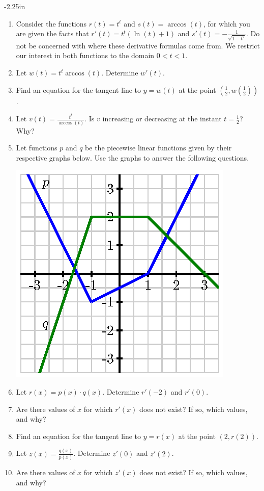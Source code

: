 \begin{adjustwidth*}{}{-2.25in}
\setlength{\columnsep}{25pt}
\begin{multicols*}{2}\small

\begin{enumerate}[1),start=40]
\item Consider the functions $r(t) = t^t$ and $s(t) = \arccos(t)$, for which you are given the facts that $r'(t) = t^t(\ln(t) + 1)$ and $s'(t) = -\frac{1}{\sqrt{1-t^2}}$.  Do not be concerned with where these derivative formulas come from.  We restrict our interest in both functions to the domain $0 < t < 1$.
\ba
	\item Let $w(t) = t^t \arccos(t)$.  Determine $w'(t)$.
	\item Find an equation for the tangent line to $y = w(t)$ at the point $(\frac{1}{2}, w(\frac{1}{2}))$.
	\item Let $v(t) = \frac{t^t}{\arccos(t)}$.  Is $v$ increasing or decreasing at the instant $t = \frac{1}{2}$?  Why?
\ea

\item Let functions $p$ and $q$ be the piecewise linear functions given by their respective graphs below.  Use the graphs to answer the following questions.
\begin{center}
\includegraphics[scale=.75]{figures/2_1_Ez3.eps}
\end{center}
\ba
	\item Let $r(x) = p(x) \cdot q(x)$.  Determine $r'(-2)$ and $r'(0)$.
	\item Are there values of $x$ for which $r'(x)$ does not exist?  If so, which values, and why?
	\item Find an equation for the tangent line to $y = r(x)$ at the point $(2,r(2))$.
	\item Let $z(x) = \frac{q(x)}{p(x)}$.  Determine $z'(0)$ and $z'(2)$.
	\item Are there values of $x$ for which $z'(x)$ does not exist?  If so, which values, and why?	
\ea


\end{enumerate}
\end{multicols*}
\end{adjustwidth*}
